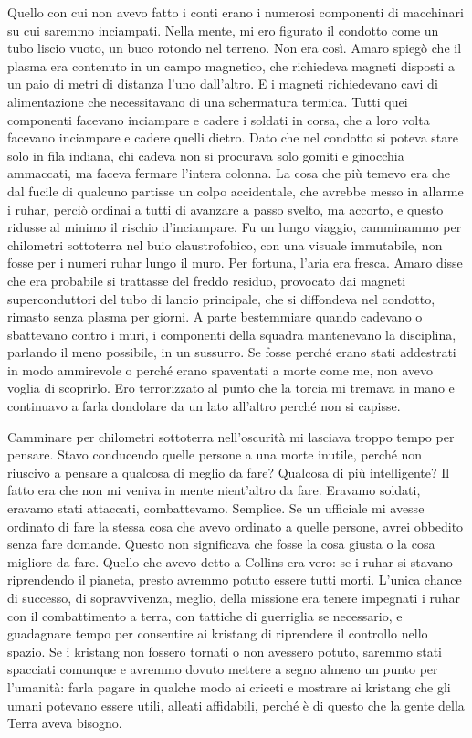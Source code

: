 Quello con cui non avevo fatto i conti erano i numerosi componenti di
macchinari su cui saremmo inciampati. Nella mente, mi ero figurato il
condotto come un tubo liscio vuoto, un buco rotondo nel terreno. Non era
così. Amaro spiegò che il plasma era contenuto in un campo magnetico,
che richiedeva magneti disposti a un paio di metri di distanza l'uno
dall'altro. E i magneti richiedevano cavi di alimentazione che
necessitavano di una schermatura termica. Tutti quei componenti facevano
inciampare e cadere i soldati in corsa, che a loro volta facevano
inciampare e cadere quelli dietro. Dato che nel condotto si poteva stare
solo in fila indiana, chi cadeva non si procurava solo gomiti e
ginocchia ammaccati, ma faceva fermare l'intera colonna. La cosa che più
temevo era che dal fucile di qualcuno partisse un colpo accidentale, che
avrebbe messo in allarme i ruhar, perciò ordinai a tutti di avanzare a
passo svelto, ma accorto, e questo ridusse al minimo il rischio
d'inciampare. Fu un lungo viaggio, camminammo per chilometri sottoterra
nel buio claustrofobico, con una visuale immutabile, non fosse per i
numeri ruhar lungo il muro. Per fortuna, l'aria era fresca. Amaro disse
che era probabile si trattasse del freddo residuo, provocato dai magneti
superconduttori del tubo di lancio principale, che si diffondeva nel
condotto, rimasto senza plasma per giorni. A parte bestemmiare quando
cadevano o sbattevano contro i muri, i componenti della squadra
mantenevano la disciplina, parlando il meno possibile, in un sussurro.
Se fosse perché erano stati addestrati in modo ammirevole o perché erano
spaventati a morte come me, non avevo voglia di scoprirlo. Ero
terrorizzato al punto che la torcia mi tremava in mano e continuavo a
farla dondolare da un lato all'altro perché non si capisse.

Camminare per chilometri sottoterra nell'oscurità mi lasciava troppo
tempo per pensare. Stavo conducendo quelle persone a una morte inutile,
perché non riuscivo a pensare a qualcosa di meglio da fare? Qualcosa di
più intelligente? Il fatto era che non mi veniva in mente nient'altro da
fare. Eravamo soldati, eravamo stati attaccati, combattevamo. Semplice.
Se un ufficiale mi avesse ordinato di fare la stessa cosa che avevo
ordinato a quelle persone, avrei obbedito senza fare domande. Questo non
significava che fosse la cosa giusta o la cosa migliore da fare. Quello
che avevo detto a Collins era vero: se i ruhar si stavano riprendendo il
pianeta, presto avremmo potuto essere tutti morti. L'unica chance di
successo, di sopravvivenza, meglio, della missione era tenere impegnati
i ruhar con il combattimento a terra, con tattiche di guerriglia se
necessario, e guadagnare tempo per consentire ai kristang di riprendere
il controllo nello spazio. Se i kristang non fossero tornati o non
avessero potuto, saremmo stati spacciati comunque e avremmo dovuto
mettere a segno almeno un punto per l'umanità: farla pagare in qualche
modo ai criceti e mostrare ai kristang che gli umani potevano essere
utili, alleati affidabili, perché è di questo che la gente della Terra
aveva bisogno.

